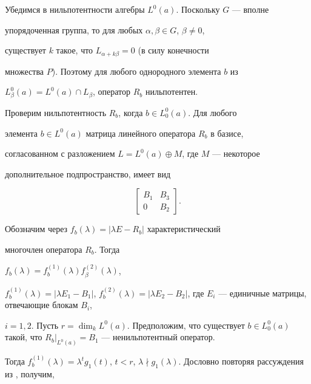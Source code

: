  


\begin{pf} 


Убедимся в нильпотентности алгебры $L^0(a)$. Поскольку $G$ --- вполне 


упорядоченная группа, то для любых $\alpha,\beta\in G$, $\beta\ne0$, 


существует $k$ такое, что $L_{\alpha+k\beta}=0$ (в силу конечности 


множества $P$). Поэтому для любого однородного элемента $b$ из 


$L^0_\beta(a)=L^0(a)\cap L_\beta$, оператор $R_b$ нильпотентен. 


 


Проверим нильпотентность $R_b$, когда $b\in L^0_0(a)$. Для любого 


элемента $b\in L^0(a)$ матрица линейного оператора $R_b$ в базисе, 


согласованном с разложением $L=L^0(a)\oplus M$, где $M$ --- некоторое 


дополнительное подпространство, имеет вид 


$$ 


\begin{bmatrix} 


B_1 & B_3 \\ 0 & B_2 


\end{bmatrix} 


. 


$$ 


 


Обозначим через $f_b(\lambda)=|\lambda E-R_b|$ характеристический 


многочлен оператора $R_b$. Тогда 


$f_b(\lambda)=f^{(1)}_b(\lambda)f^{(2)}_\beta(\lambda)$, 


$f^{(1)}_b(\lambda)=|\lambda E_1-B_1|$, $f^{(2)}_b(\lambda)=|\lambda 


E_2-B_2|$, где $E_i$ --- единичные матрицы, отвечающие блокам $B_i$, 


$i=1,2$. Пусть $r=\dim_k L^0(a)$. Предположим, что существует $b\in 


L^0_0(a)$ такой, что $R_b\big|_{L^0(a)}=B_1$ --- ненильпотентный оператор. 


Тогда $f^{(1)}_b(\lambda)=\lambda^t g_1(t)$, $t<r$, $\lambda\nmid 


g_1(\lambda)$. Дословно повторяя рассуждения из \cite{3}, получим, 



\end{pf}
